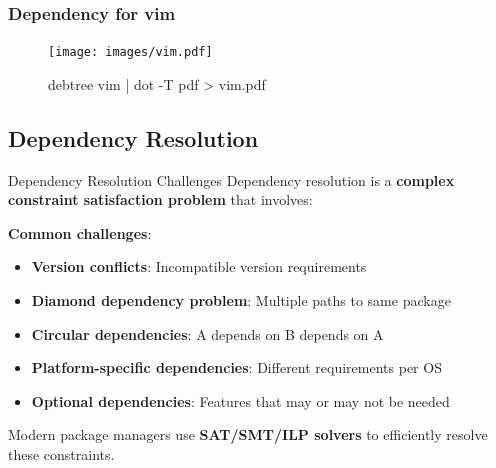 \documentclass{beamer}
\begin{document}
\begin{frame}[t]
    \frametitle{Dependency for vim}

    
    \begin{figure}
    \begin{center}
        \texttt{[image: images/vim.pdf]}
    \end{center}
    \caption{debtree vim | dot -T pdf > vim.pdf}
    \end{figure}
    
\end{frame}
\subsection{Dependency Resolution}

\begin{frame}[t]{Dependency Resolution Challenges}
Dependency resolution is a \textbf{complex constraint satisfaction problem} that involves:

\bigskip

\textbf{Common challenges}:
\begin{itemize}
\item \textbf{Version conflicts}: Incompatible version requirements
\item \textbf{Diamond dependency problem}: Multiple paths to same package
\item \textbf{Circular dependencies}: A depends on B depends on A
\item \textbf{Platform-specific dependencies}: Different requirements per OS
\item \textbf{Optional dependencies}: Features that may or may not be needed
\end{itemize}

\bigskip

Modern package managers use \textbf{SAT/SMT/ILP solvers} to efficiently resolve these constraints.
\end{frame}
\end{document}
